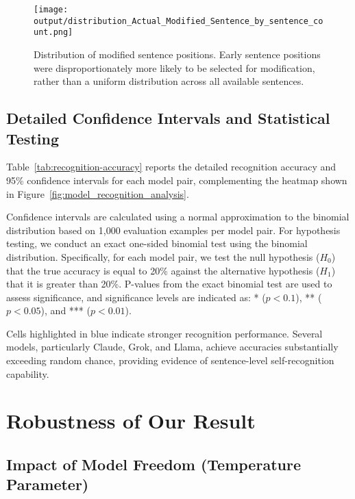 \documentclass{article}
\begin{document}
\begin{figure}[ht]
    \centering
    \texttt{[image: output/distribution\_Actual\_Modified\_Sentence\_by\_sentence\_count.png]}
    \caption{Distribution of modified sentence positions. Early sentence positions were disproportionately more likely to be selected for modification, rather than a uniform distribution across all available sentences.}
    \label{fig:distribution_Actual_Modified_Sentence_by_sentence_count}
\end{figure}



\subsection{Detailed Confidence Intervals and Statistical Testing}

Table~\ref{tab:recognition-accuracy} reports the detailed recognition accuracy and 95\% confidence intervals for each model pair, complementing the heatmap shown in Figure~\ref{fig:model_recognition_analysis}.

Confidence intervals are calculated using a normal approximation to the binomial distribution based on 1,000 evaluation examples per model pair. 
For hypothesis testing, we conduct an exact one-sided binomial test using the binomial distribution. 
Specifically, for each model pair, we test the null hypothesis ($H_0$) that the true accuracy is equal to 20\% against the alternative hypothesis ($H_1$) that it is greater than 20\%. P-values from the exact binomial test are used to assess significance, and significance levels are indicated as: * ($p < 0.1$), ** ($p < 0.05$), and *** ($p < 0.01$).

Cells highlighted in blue indicate stronger recognition performance. Several models, particularly Claude, Grok, and Llama, achieve accuracies substantially exceeding random chance, providing evidence of sentence-level self-recognition capability.

{\footnotesize

}






\section{Robustness of Our Result}

\subsection{Impact of Model Freedom (Temperature Parameter)}
\end{document}
